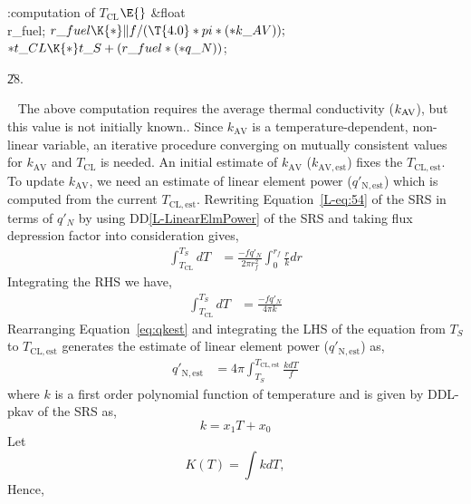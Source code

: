 \documentclass[letterpaper,12pt,baseclass=report]{cweb-hy}
\begin{document}
{\Y\B\4:computation of $T_{\mathrm{CL}}$\X${}\E{}$\6
\&{float} \\{r\_fuel};\7
${}\\{r\_fuel}\K{*}\|f/(\T{4.0}*\\{pi}*({*}\\{k\_AV}));{}$\6
${}{*}\\{t\_CL}\K{*}\\{t\_S}+(\\{r\_fuel}*({*}\\{q\_N})){}$;\par
\U28.\fi

~\newline
The above computation requires the average thermal conductivity ($k_{%
\mathrm{AV}}$),
but this value is not initially known.. Since $k_{\mathrm{AV}}$ is a
temperature-dependent, non-linear variable, an iterative procedure
converging on mutually consistent values for $k_{\mathrm{AV}}$ and
$T_{\mathrm{CL}}$ is needed.	
An initial estimate of
$k_{\mathrm{AV}}$ ($k_{\mathrm{AV,est}}$) fixes the $T_{\mathrm{CL,est}}$. To
update
$k_{\mathrm{AV}}$, we need an estimate of linear element power
($q'_{\mathrm{N,est}}$) which is computed from the current
$T_{\mathrm{CL,est}}$. Rewriting Equation~\ref{L-eq:54} of the SRS in terms of
$q'_N$ by
using DD\ref{L-LinearElmPower} of the SRS and taking flux depression factor
into consideration gives,
\begin{align}
\int^{T_S}_{T_{\mathrm{CL}}}dT&= \frac{-fq'_N}{2\pi r_f^2}\int^{r_f}_{0}%
\frac{r}{k}dr
\end{align}
Integrating the RHS we have,
\begin{align}
\int^{T_S}_{T_{\mathrm{CL}}}dT&=\frac{-fq'_N}{4\pi k} \label{eq:qkest}
\end{align}
Rearranging Equation~\ref{eq:qkest} and integrating the LHS of the equation
from
$T_S$ to $T_{\mathrm{CL,est}}$ generates the estimate of linear element power
($q'_{\mathrm{N,est}}$) as,
\begin{align}
q'_{\mathrm{N,est}}&=4\pi \displaystyle{\int^{T_{\mathrm{CL,est}}}_{T_S} \frac
{kdT}{ f}}\label{eq:18}
\end{align}
where $k$ is a first order polynomial function of temperature and is
given by DD{L-pkav} of the SRS as,
\begin{equation}
k = x_1 T + x_0
\end{equation}
Let
\begin{equation}
K(T)=\int kdT,
\end{equation}
Hence,
\begin{align}

\end{align}}
\end{document}
